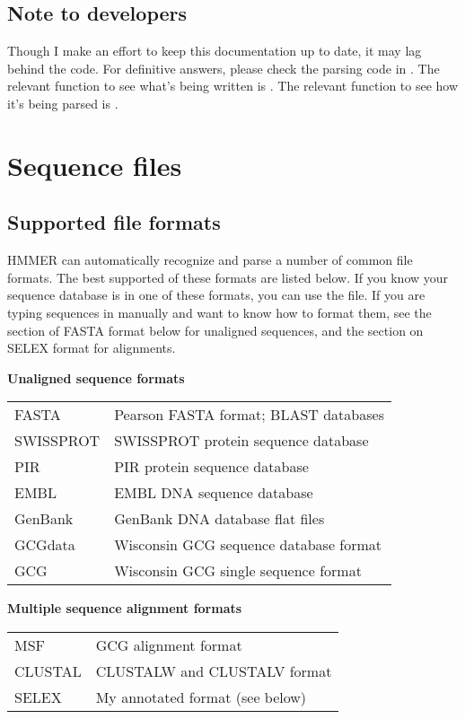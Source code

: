 \subsection{Note to developers}

Though I make an effort to keep this documentation up to date, it may
lag behind the code. For definitive answers, please check the parsing
code in . The relevant function to see what's being
written is . The relevant function to see how it's
being parsed is .


\section {Sequence files}

\subsection{Supported file formats}
 
HMMER can automatically recognize and parse a number of common file
formats. The best supported of these formats are listed below. If you
know your sequence database is in one of these formats, you can use
the file.  If you are typing sequences in manually and want to know
how to format them, see the section of FASTA format below for
unaligned sequences, and the section on SELEX format for alignments.

\textbf{Unaligned sequence formats}
\begin{tabular}{ll}
FASTA     & Pearson FASTA format; BLAST databases \\
SWISSPROT & SWISSPROT protein sequence database\\ 
PIR       & PIR protein sequence database \\
EMBL      & EMBL DNA sequence database \\
GenBank   & GenBank DNA database flat files\\
GCGdata   & Wisconsin GCG sequence database format \\
GCG       & Wisconsin GCG single sequence format \\
\end{tabular}

\textbf{Multiple sequence alignment formats}
\begin{tabular}{ll}
MSF     &   GCG alignment format \\
CLUSTAL &   CLUSTALW and CLUSTALV format \\
SELEX   &   My annotated format (see below)\\
\end{tabular}

